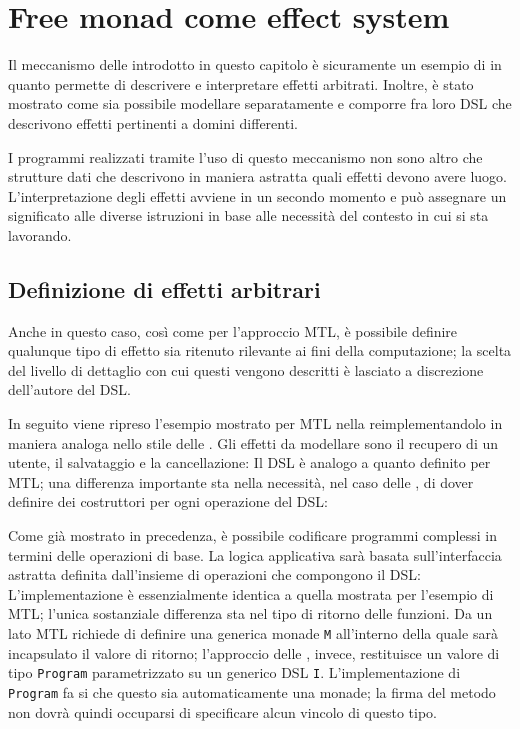 \section{Free monad come effect system}
Il meccanismo delle  introdotto in questo capitolo è sicuramente un esempio di  in quanto permette di descrivere e interpretare effetti arbitrati. Inoltre, è stato mostrato come sia possibile modellare separatamente e comporre fra loro DSL che descrivono effetti pertinenti a domini differenti.

I programmi realizzati tramite l'uso di questo meccanismo non sono altro che strutture dati che descrivono in maniera astratta quali effetti devono avere luogo. L'interpretazione degli effetti avviene in un secondo momento e può assegnare un significato alle diverse istruzioni in base alle necessità del contesto in cui si sta lavorando.

\subsection{Definizione di effetti arbitrari}
\label{sec:free-effetti-arbitrari}
Anche in questo caso, così come per l'approccio MTL, è possibile definire qualunque tipo di effetto sia ritenuto rilevante ai fini della computazione; la scelta del livello di dettaglio con cui questi vengono descritti è lasciato a discrezione dell'autore del DSL.

In seguito viene ripreso l'esempio mostrato per MTL nella  reimplementandolo in maniera analoga nello stile delle . Gli effetti da modellare sono il recupero di un utente, il salvataggio e la cancellazione:
Il DSL è analogo a quanto definito per MTL; una differenza importante sta nella necessità, nel caso delle , di dover definire dei costruttori per ogni operazione del DSL:

Come già mostrato in precedenza, è possibile codificare programmi complessi in termini delle operazioni di base. La logica applicativa sarà basata sull'interfaccia astratta definita dall'insieme di operazioni che compongono il DSL:
L'implementazione è essenzialmente identica a quella mostrata per l'esempio di MTL; l'unica sostanziale differenza sta nel tipo di ritorno delle funzioni. Da un lato MTL richiede di definire una generica monade \lstinline{M} all'interno della quale sarà incapsulato il valore di ritorno; l'approccio delle , invece, restituisce un valore di tipo \lstinline{Program} parametrizzato su un generico DSL \lstinline{I}.
L'implementazione di \lstinline{Program} fa si che questo sia automaticamente una monade; la firma del metodo non dovrà quindi occuparsi di specificare alcun vincolo di questo tipo.

